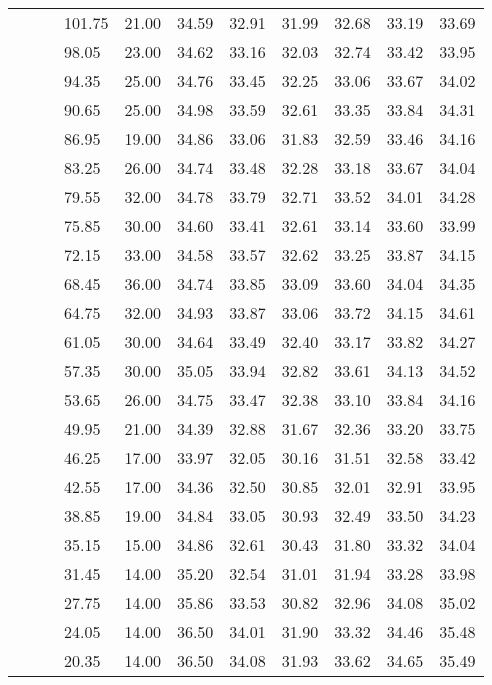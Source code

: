 \begin{longtable}{llllrrrrrrr}
   &  &  & 101.75 & 21.00 & 34.59 & 32.91 & 31.99 & 32.68 & 33.19 & 33.69 \\ 
   &  &  & 98.05 & 23.00 & 34.62 & 33.16 & 32.03 & 32.74 & 33.42 & 33.95 \\ 
   &  &  & 94.35 & 25.00 & 34.76 & 33.45 & 32.25 & 33.06 & 33.67 & 34.02 \\ 
   &  &  & 90.65 & 25.00 & 34.98 & 33.59 & 32.61 & 33.35 & 33.84 & 34.31 \\ 
   &  &  & 86.95 & 19.00 & 34.86 & 33.06 & 31.83 & 32.59 & 33.46 & 34.16 \\ 
   &  &  & 83.25 & 26.00 & 34.74 & 33.48 & 32.28 & 33.18 & 33.67 & 34.04 \\ 
   &  &  & 79.55 & 32.00 & 34.78 & 33.79 & 32.71 & 33.52 & 34.01 & 34.28 \\ 
   &  &  & 75.85 & 30.00 & 34.60 & 33.41 & 32.61 & 33.14 & 33.60 & 33.99 \\ 
   &  &  & 72.15 & 33.00 & 34.58 & 33.57 & 32.62 & 33.25 & 33.87 & 34.15 \\ 
   &  &  & 68.45 & 36.00 & 34.74 & 33.85 & 33.09 & 33.60 & 34.04 & 34.35 \\ 
   &  &  & 64.75 & 32.00 & 34.93 & 33.87 & 33.06 & 33.72 & 34.15 & 34.61 \\ 
   &  &  & 61.05 & 30.00 & 34.64 & 33.49 & 32.40 & 33.17 & 33.82 & 34.27 \\ 
   &  &  & 57.35 & 30.00 & 35.05 & 33.94 & 32.82 & 33.61 & 34.13 & 34.52 \\ 
   &  &  & 53.65 & 26.00 & 34.75 & 33.47 & 32.38 & 33.10 & 33.84 & 34.16 \\ 
   &  &  & 49.95 & 21.00 & 34.39 & 32.88 & 31.67 & 32.36 & 33.20 & 33.75 \\ 
   &  &  & 46.25 & 17.00 & 33.97 & 32.05 & 30.16 & 31.51 & 32.58 & 33.42 \\ 
   &  &  & 42.55 & 17.00 & 34.36 & 32.50 & 30.85 & 32.01 & 32.91 & 33.95 \\ 
   &  &  & 38.85 & 19.00 & 34.84 & 33.05 & 30.93 & 32.49 & 33.50 & 34.23 \\ 
   &  &  & 35.15 & 15.00 & 34.86 & 32.61 & 30.43 & 31.80 & 33.32 & 34.04 \\ 
   &  &  & 31.45 & 14.00 & 35.20 & 32.54 & 31.01 & 31.94 & 33.28 & 33.98 \\ 
   &  &  & 27.75 & 14.00 & 35.86 & 33.53 & 30.82 & 32.96 & 34.08 & 35.02 \\ 
   &  &  & 24.05 & 14.00 & 36.50 & 34.01 & 31.90 & 33.32 & 34.46 & 35.48 \\ 
   &  &  & 20.35 & 14.00 & 36.50 & 34.08 & 31.93 & 33.62 & 34.65 & 35.49 \\ 

\end{longtable}
